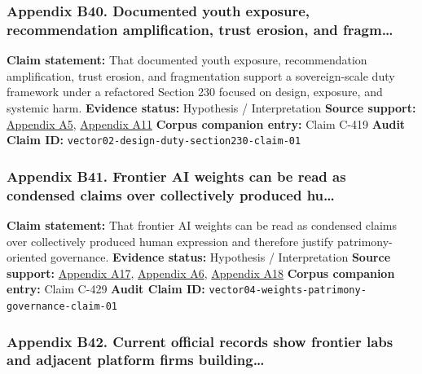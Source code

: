 \documentclass[
  american,
  11pt,
  letterpaper,
]{article}
\begin{document}
\subsubsection{Appendix B40. Documented youth exposure, recommendation
amplification, trust erosion, and
fragm\ldots{}}\label{appendix-b40-documented-youth-exposure-recommendation-amplification-trust-erosion-and-fragm}

\textbf{Claim statement:} That documented youth exposure, recommendation
amplification, trust erosion, and fragmentation support a
sovereign-scale duty framework under a refactored Section 230 focused on
design, exposure, and systemic harm. \textbf{Evidence status:}
Hypothesis / Interpretation \textbf{Source support:}
\hyperref[appendix-a5-social-media-and-youth-mental-health-the-u-s-surgeon-general-s-advisory]{Appendix
A5},
\hyperref[appendix-a11-social-media-seen-as-mostly-good-for-democracy-across-many-nations-but-u-s-is-a-major-outlier]{Appendix
A11} \textbf{Corpus companion entry:} Claim C-419 \textbf{Audit Claim
ID:} \texttt{vector02-design-duty-section230-claim-01}

\subsubsection{Appendix B41. Frontier AI weights can be read as
condensed claims over collectively produced
hu\ldots{}}\label{appendix-b41-frontier-ai-weights-can-be-read-as-condensed-claims-over-collectively-produced-hu}

\textbf{Claim statement:} That frontier AI weights can be read as
condensed claims over collectively produced human expression and
therefore justify patrimony-oriented governance. \textbf{Evidence
status:} Hypothesis / Interpretation \textbf{Source support:}
\hyperref[appendix-a17-ai-copyright-weights-a-new-frontier-in-intellectual-property-law]{Appendix
A17},
\hyperref[appendix-a6-copyright-and-artificial-intelligence-part-3-generative-ai-training-pre-publication-version]{Appendix
A6},
\hyperref[appendix-a18-bipartisan-house-task-force-report-on-artificial-intelligence]{Appendix
A18} \textbf{Corpus companion entry:} Claim C-429 \textbf{Audit Claim
ID:} \texttt{vector04-weights-patrimony-governance-claim-01}

\subsubsection{Appendix B42. Current official records show frontier labs
and adjacent platform firms
building\ldots{}}\label{appendix-b42-current-official-records-show-frontier-labs-and-adjacent-platform-firms-building}
\end{document}
